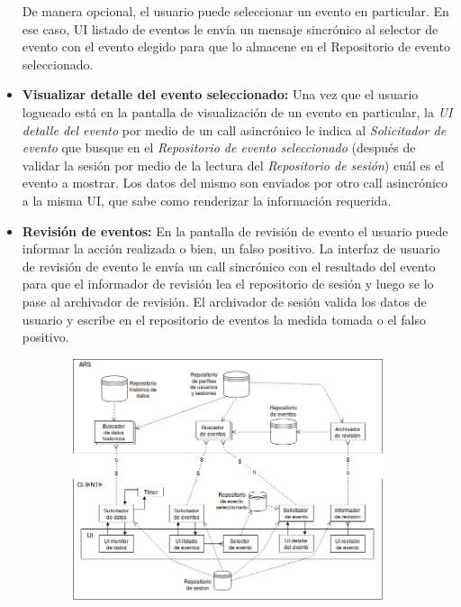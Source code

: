 \begin{itemize}
    De manera opcional, el usuario puede seleccionar un evento en particular. En ese caso, UI listado de eventos le envía un mensaje sincrónico al selector de evento con el evento elegido para que lo almacene en el Repositorio de evento seleccionado.
    \item \textbf{Visualizar detalle del evento seleccionado:} Una vez que el usuario logueado está en la pantalla de visualización de un evento en particular, la \textit{UI detalle del evento} por medio de un call asincrónico le indica al \textit{Solicitador de evento} que busque en el \textit{Repositorio de evento seleccionado} (después de validar la sesión por medio de la lectura del \textit{Repositorio de sesión}) cuál es el evento a mostrar. Los datos del mismo son enviados por otro call asincrónico a la misma UI, que sabe como renderizar la información requerida.
    \item \textbf{Revisión de eventos:} En la pantalla de revisión de evento el usuario puede informar la acción realizada o bien, un falso positivo. La interfaz de usuario de revisión de evento le envía un call sincrónico con el resultado del evento para que el informador de revisión lea el repositorio de sesión y luego se lo pase al archivador de revisión. El archivador de sesión valida los datos de usuario y escribe en el repositorio de eventos la medida tomada o el falso positivo.
\end{itemize}

\begin{figure}[H]
  \begin{subfigure}{\textwidth}
    \includegraphics[width=\textwidth]{imagenes/diagramas/interaccionConClientes.png}
  \end{subfigure}
  \label{}
  \caption{}
\end{figure}


